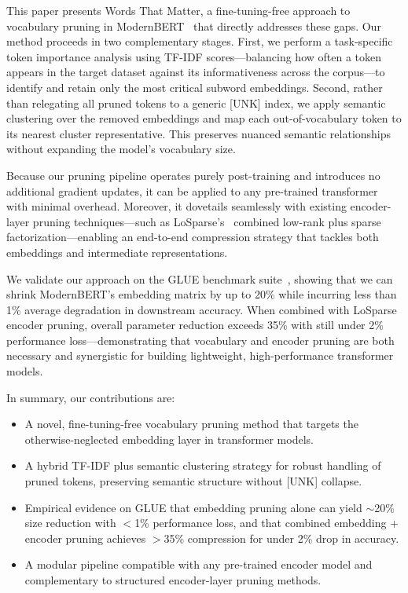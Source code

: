\documentclass[twocolumn]{article}
\begin{document}
This paper presents Words That Matter, a fine-tuning-free approach to vocabulary pruning in ModernBERT~\cite{modernbert2023} that directly addresses these gaps. Our method proceeds in two complementary stages. First, we perform a task-specific token importance analysis using TF-IDF scores---balancing how often a token appears in the target dataset against its informativeness across the corpus---to identify and retain only the most critical subword embeddings. Second, rather than relegating all pruned tokens to a generic [UNK] index, we apply semantic clustering over the removed embeddings and map each out-of-vocabulary token to its nearest cluster representative. This preserves nuanced semantic relationships without expanding the model's vocabulary size.

Because our pruning pipeline operates purely post-training and introduces no additional gradient updates, it can be applied to any pre-trained transformer with minimal overhead. Moreover, it dovetails seamlessly with existing encoder-layer pruning techniques---such as LoSparse's~\cite{losparse2023} combined low-rank plus sparse factorization---enabling an end-to-end compression strategy that tackles both embeddings and intermediate representations.

We validate our approach on the GLUE benchmark suite~\cite{wang2018glue}, showing that we can shrink ModernBERT's embedding matrix by up to 20\% while incurring less than 1\% average degradation in downstream accuracy. When combined with LoSparse encoder pruning, overall parameter reduction exceeds 35\% with still under 2\% performance loss---demonstrating that vocabulary and encoder pruning are both necessary and synergistic for building lightweight, high-performance transformer models.

In summary, our contributions are:

\begin{itemize}
    \item A novel, fine-tuning-free vocabulary pruning method that targets the otherwise-neglected embedding layer in transformer models.
    
    \item A hybrid TF-IDF plus semantic clustering strategy for robust handling of pruned tokens, preserving semantic structure without [UNK] collapse.
    
    \item Empirical evidence on GLUE that embedding pruning alone can yield $\sim$20\% size reduction with $<$1\% performance loss, and that combined embedding + encoder pruning achieves $>$35\% compression for under 2\% drop in accuracy.
    
    \item A modular pipeline compatible with any pre-trained encoder model and complementary to structured encoder-layer pruning methods.
\end{itemize}
\end{document}
